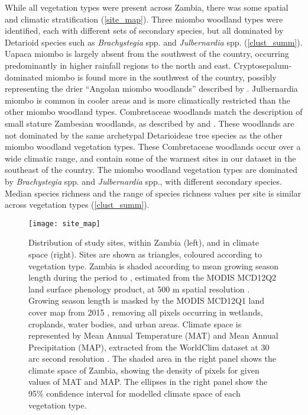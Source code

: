 \documentclass[11pt,a4paper]{article}
\begin{document}
While all vegetation types were present across Zambia, there was some spatial and climatic stratification (\autoref{site_map}). Three miombo woodland types were identified, each with different sets of secondary species, but all dominated by Detarioid species such as \textit{Brachystegia} spp. and \textit{Julbernardia} spp. (\autoref{clust_summ}). Uapaca miombo is largely absent from the southwest of the country, occurring predominantly in higher rainfall regions to the north and east. Cryptosepalum-dominated miombo is found more in the southwest of the country, possibly representing the drier ``Angolan miombo woodlands'' described by \citet{White1983}. Julbernardia miombo is common in cooler areas and is more climatically restricted than the other miombo woodland types. Combretaceae woodlands match the description of small stature Zambesian woodlands, as described by \citet{Dinerstein2017} and \citet{Chidumayo2001}. These woodlands are not dominated by the same archetypal Detarioideae tree species as the other miombo woodland vegetation types. These Combretaceae woodlands occur over a wide climatic range, and contain some of the warmest sites in our dataset in the southeast of the country. The miombo woodland vegetation types are dominated by \textit{Brachystegia} spp. and \textit{Julbernardia} spp., with different secondary species. Median species richness and the range of species richness values per site is similar across vegetation types (\autoref{clust_summ}). 

\begin{figure}[H]
\centering
	\texttt{[image: site\_map]}
	\caption{Distribution of study sites, within Zambia (left), and in climate space (right). Sites are shown as triangles, coloured according to vegetation type. Zambia is shaded according to mean growing season length during the period \modisStart{} to \modisEnd{}, estimated from the MODIS MCD12Q2 land surface phenology product, at 500 m spatial resolution \citep{MCD12Q2}. Growing season length is masked by the MODIS MCD12Q1 land cover map from 2015 \citep{MCD12Q1}, removing all pixels occurring in wetlands, croplands, water bodies, and urban areas. Climate space is represented by Mean Annual Temperature (MAT) and Mean Annual Precipitation (MAP), extracted from the WorldClim dataset at 30 arc second resolution \citep{Fick2017}. The shaded area in the right panel shows the climate space of Zambia, showing the density of pixels for given values of MAT and MAP. The ellipses in the right panel show the 95\% confidence interval for modelled climate space of each vegetation type.} 
	\label{site_map}
\end{figure}
\end{document}
